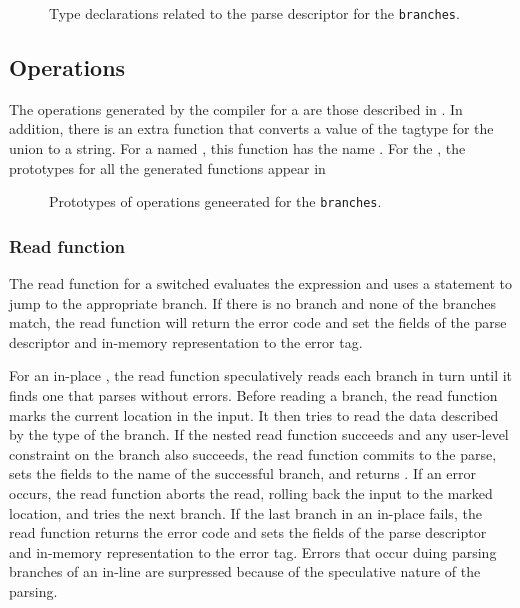 \begin{figure}

\caption{Type declarations related to the parse descriptor for
  the \Punion{} \texttt{branches}.}
\label{fig:punion-pd}
\end{figure}

\subsection{Operations}
The operations generated by the \pads{} compiler for a \Punion{} are
those described in .  In addition, there
is an extra function that converts a value of the tagtype for the
union to a string.  For a \Punion{} named , this function
has the name .  
For the \Punion{}
, the prototypes for all the generated functions appear in
\begin{figure}

\caption{Prototypes of operations geneerated for
  the \Punion{} \texttt{branches}.}
\label{fig:punion-ops}
\end{figure}



\subsubsection{Read function}
The read function for a switched \Punion{} evaluates the \Pswitch{}
expression and uses a \C{}  statement to jump to the
appropriate branch.  If there is no \Pdefault{} branch and none of the
\Pcase{} branches match,  the read function will return the error code
 and set the  fields of the parse
descriptor and in-memory representation to the error tag. 

For an in-place \Punion{}, the read function speculatively reads each
branch in turn until it finds one that parses without errors.  Before
reading a branch, the read function marks the 
current location in the input.  It then tries to read the data
described by the type of the branch.  If the nested read function
succeeds and any user-level constraint on the branch also succeeds,
the read function commits to the parse, sets the  fields to
the name of the successful branch, and returns
. If an error occurs, the read function aborts the
read, rolling back the input to the marked location, and tries the next
branch.  If the last branch in an in-place \Punion{} fails, the read
function returns the error code
 and sets the  fields of the parse
descriptor and in-memory representation to the error tag. 
Errors that occur duing parsing branches of an in-line \Punion{} are
surpressed because of the speculative nature of the parsing.

